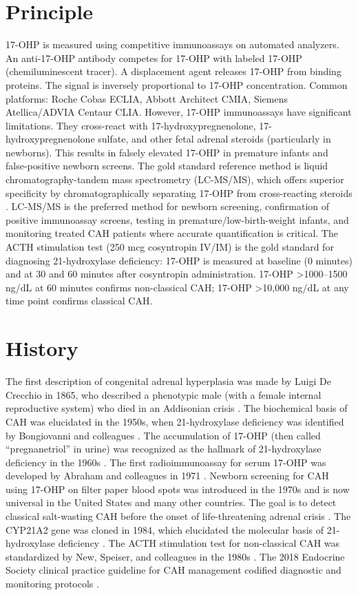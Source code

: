 \section*{Principle}
17-OHP is measured using competitive immunoassays on automated analyzers. An anti-17-OHP antibody competes for 17-OHP with labeled 17-OHP (chemiluminescent tracer). A displacement agent releases 17-OHP from binding proteins. The signal is inversely proportional to 17-OHP concentration. Common platforms: Roche Cobas ECLIA, Abbott Architect CMIA, Siemens Atellica/ADVIA Centaur CLIA. However, 17-OHP immunoassays have significant limitations. They cross-react with 17-hydroxypregnenolone, 17-hydroxypregnenolone sulfate, and other fetal adrenal steroids (particularly in newborns). This results in falsely elevated 17-OHP in premature infants and false-positive newborn screens. The gold standard reference method is liquid chromatography-tandem mass spectrometry (LC-MS/MS), which offers superior specificity by chromatographically separating 17-OHP from cross-reacting steroids \cite{rifai2018tietz}. LC-MS/MS is the preferred method for newborn screening, confirmation of positive immunoassay screens, testing in premature/low-birth-weight infants, and monitoring treated CAH patients where accurate quantification is critical. The ACTH stimulation test (250 mcg cosyntropin IV/IM) is the gold standard for diagnosing 21-hydroxylase deficiency: 17-OHP is measured at baseline (0 minutes) and at 30 and 60 minutes after cosyntropin administration. 17-OHP >1000--1500 ng/dL at 60 minutes confirms non-classical CAH; 17-OHP >10,000 ng/dL at any time point confirms classical CAH.

\section*{History}
The first description of congenital adrenal hyperplasia was made by Luigi De Crecchio in 1865, who described a phenotypic male (with a female internal reproductive system) who died in an Addisonian crisis \cite{whitespeiser2000congenital}. The biochemical basis of CAH was elucidated in the 1950s, when 21-hydroxylase deficiency was identified by Bongiovanni and colleagues \cite{bongiovanni1963adrenogenital}. The accumulation of 17-OHP (then called ``pregnanetriol'' in urine) was recognized as the hallmark of 21-hydroxylase deficiency in the 1960s \cite{whitespeiser2000congenital}. The first radioimmunoassay for serum 17-OHP was developed by Abraham and colleagues in 1971 \cite{abraham1971radioimmunoassay}. Newborn screening for CAH using 17-OHP on filter paper blood spots was introduced in the 1970s and is now universal in the United States and many other countries. The goal is to detect classical salt-wasting CAH before the onset of life-threatening adrenal crisis \cite{whitespeiser2000congenital, speiser2018congenital}. The CYP21A2 gene was cloned in 1984, which elucidated the molecular basis of 21-hydroxylase deficiency \cite{white1984hlalinked}. The ACTH stimulation test for non-classical CAH was standardized by New, Speiser, and colleagues in the 1980s \cite{new2017nonclassic}. The 2018 Endocrine Society clinical practice guideline for CAH management codified diagnostic and monitoring protocols \cite{speiser2018congenital}.


